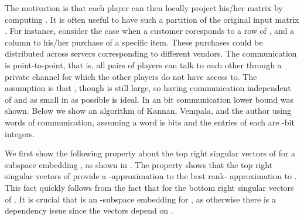 \documentclass[11pt]{article}
\begin{document}
The motivation is that each player can then locally project his/her matrix  by computing 
. It is often useful to have such a partition of the original input matrix . For instance,
consider the case when a customer coresponds to a row of , and a column to his/her purchase of a specific item. 
These purchases could be distributed across servers corresponding to different vendors. The communication is point-to-point,
that is, all pairs of players can talk to each other through a private channel for which the other  players do not
have access to. The assumption is that , though  is still large, so having communication independent of 
and as small in  as possible is ideal. In \cite{kvw14} an  bit communication lower bound was shown. 
Below we show an algorithm of Kannan, Vempala, and the author \cite{kvw14} using  words of communication, 
assuming a word is  bits and the entries of each  are -bit integers. 

We first show the following property about the top  right 
singular vectors of  for a subspace
embedding , as shown in \cite{kvw14}. The property shows that 
the top  right singular
vectors  of  provide a 
-approximation to the best rank- approximation
to . This fact quickly follows from the fact that 
 for the bottom  right singular vectors
 of . It is crucial that  is an -subspace
embedding for , as otherwise there is a dependency issue since 
the vectors  depend on . 
\end{document}
